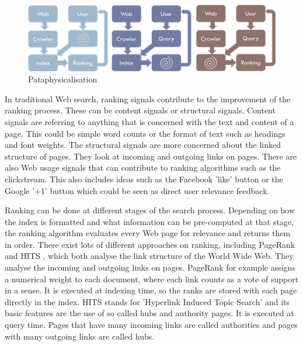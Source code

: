 
\begin{figure}[htb] %
  \centering
  \includegraphics[width=\linewidth]{images/patasearch02}
\caption[Pataphysicalisation]{Pataphysicalisation}
\label{fig:patasearch02}
\end{figure}

In traditional Web search, ranking signals contribute to the improvement of the ranking process. These can be content signals or structural signals. Content signals are referring to anything that is concerned with the text and content of a page. This could be simple word counts or the format of text such as headings and font weights. The structural signals are more concerned about the linked structure of pages. They look at incoming and outgoing links on pages. There are also Web usage signals that can contribute to ranking algorithms such as the clickstream. This also includes ideas such as the Facebook 'like' button or the Google '+1' button which could be seen as direct user relevance feedback.

Ranking can be done at different stages of the search process. Depending on how the index is formatted and what information can be pre-computed at that stage, the ranking algorithm evaluates every Web page for relevance and returns them in order. There exist lots of different approaches on ranking, including PageRank \citep{Brin1998} and HITS \citep{Kleinberg1999}, which both analyse the link structure of the World Wide Web. They analyse the incoming and outgoing links on pages. PageRank for example assigns a numerical weight to each document, where each link counts as a vote of support in a sense. It is executed at indexing time, so the ranks are stored with each page directly in the index. HITS stands for 'Hyperlink Induced Topic Search' and its basic features are the use of so called hubs and authority pages. It is executed at query time. Pages that have many incoming links are called authorities and pages with many outgoing links are called hubs.

